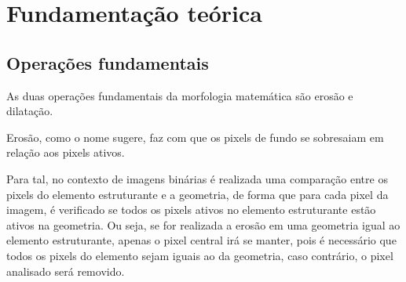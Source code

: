 \documentclass[conference,harvard,brazil,english]{sbatex}
\begin{document}
\section{Fundamentação teórica}
\subsection{Operações fundamentais}

As duas operações fundamentais da morfologia matemática são erosão e dilatação.

Erosão, como o nome sugere, faz com que os pixels de fundo se sobresaiam em relação aos pixels ativos. 

Para tal, no contexto de imagens binárias é realizada uma comparação entre os pixels do elemento estruturante e a geometria, de forma que para cada pixel da imagem, é verificado se todos os pixels ativos no elemento estruturante estão ativos na geometria. Ou seja, se for realizada a erosão em uma geometria igual ao elemento estruturante, apenas o pixel central irá se manter, pois é necessário que todos os pixels do elemento sejam iguais ao da geometria, caso contrário, o pixel analisado será removido.
\end{document}
